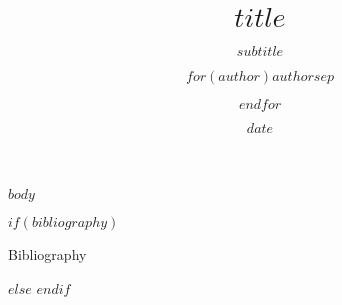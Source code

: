 \documentclass[aspectratio=169,12pt]{beamer}
\title{$title$}
\subtitle{$subtitle$}
\author{$for(author)$$author$$sep$ \and $endfor$}
\date{$date$}
\institute{$for(institute)$$institute$$sep$ \and $endfor$}
\begin{document}
\frame{\maketitle}

$body$


$if(bibliography)$
\begin{frame}[allowframebreaks]{Bibliography}
  \printbibliography[heading=none]
\end{frame}
$else$
$endif$
\end{document}
